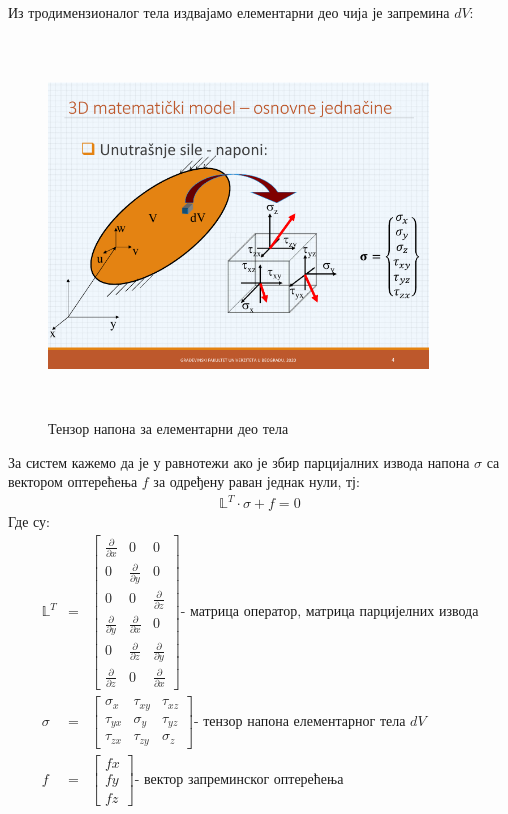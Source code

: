 \documentclass[11pt, a4paper]{article}
\begin{document}
Из тродимензионалог тела издвајамо елементарни део чија је запремина $dV$:
\begin{figure}[H]
\includegraphics[width=0.9\textwidth, height=10cm]{Slike/TenzorNapona.png}
\caption{Тензор напона за елементарни део тела \cite{mnd1}}
\end{figure}
За систем кажемо да је у равнотежи ако је збир парцијалних извода напона $\mathbb{ \sigma }$  са вектором оптерећења $f$ за одређену раван једнак нули, тј:
\begin{eqnarray}
\mathbb{L}^T \cdot \mathbb{\sigma} + f = 0
\end{eqnarray}
Где су:
\begin{eqnarray*}
\mathbb{L}^T &=& 
\begin{bmatrix}
\frac{\partial}{\partial x} & 0 & 0\\
0 & \frac{\partial}{\partial y} & 0\\
0 & 0 & \frac{\partial}{\partial z}\\
\frac{\partial}{\partial y} & \frac{\partial}{\partial x} & 0\\
0 & \frac{\partial}{\partial z} & \frac{\partial}{\partial y}\\
\frac{\partial}{\partial z} & 0 & \frac{\partial}{\partial x}
\end{bmatrix}
\text{- матрица оператор, матрица парцијелних извода}\\
\mathbb{ \sigma} &=&
 \begin{bmatrix}
\sigma_x & \tau_{xy} & \tau_{xz}\\
\tau_{yx} & \sigma_{y} & \tau_{yz}\\
\tau_{zx} & \tau_{zy} & \sigma_{z}
\end{bmatrix}
\text{- тензор напона елементарног тела } dV\\
f &=& 
\begin{bmatrix}
fx\\
fy\\
fz
\end{bmatrix} 
\text{- вектор запреминског оптерећења}
\end{eqnarray*}
\end{document}
